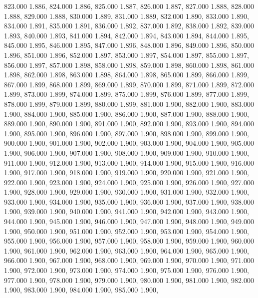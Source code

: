 823.000 1.886, 
824.000 1.886, 
825.000 1.887, 
826.000 1.887, 
827.000 1.888, 
828.000 1.888, 
829.000 1.888, 
830.000 1.889, 
831.000 1.889, 
832.000 1.890, 
833.000 1.890, 
834.000 1.891, 
835.000 1.891, 
836.000 1.892, 
837.000 1.892, 
838.000 1.892, 
839.000 1.893, 
840.000 1.893, 
841.000 1.894, 
842.000 1.894, 
843.000 1.894, 
844.000 1.895, 
845.000 1.895, 
846.000 1.895, 
847.000 1.896, 
848.000 1.896, 
849.000 1.896, 
850.000 1.896, 
851.000 1.896, 
852.000 1.897, 
853.000 1.897, 
854.000 1.897, 
855.000 1.897, 
856.000 1.897, 
857.000 1.898, 
858.000 1.898, 
859.000 1.898, 
860.000 1.898, 
861.000 1.898, 
862.000 1.898, 
863.000 1.898, 
864.000 1.898, 
865.000 1.899, 
866.000 1.899, 
867.000 1.899, 
868.000 1.899, 
869.000 1.899, 
870.000 1.899, 
871.000 1.899, 
872.000 1.899, 
873.000 1.899, 
874.000 1.899, 
875.000 1.899, 
876.000 1.899, 
877.000 1.899, 
878.000 1.899, 
879.000 1.899, 
880.000 1.899, 
881.000 1.900, 
882.000 1.900, 
883.000 1.900, 
884.000 1.900, 
885.000 1.900, 
886.000 1.900, 
887.000 1.900, 
888.000 1.900, 
889.000 1.900, 
890.000 1.900, 
891.000 1.900, 
892.000 1.900, 
893.000 1.900, 
894.000 1.900, 
895.000 1.900, 
896.000 1.900, 
897.000 1.900, 
898.000 1.900, 
899.000 1.900, 
900.000 1.900, 
901.000 1.900, 
902.000 1.900, 
903.000 1.900, 
904.000 1.900, 
905.000 1.900, 
906.000 1.900, 
907.000 1.900, 
908.000 1.900, 
909.000 1.900, 
910.000 1.900, 
911.000 1.900, 
912.000 1.900, 
913.000 1.900, 
914.000 1.900, 
915.000 1.900, 
916.000 1.900, 
917.000 1.900, 
918.000 1.900, 
919.000 1.900, 
920.000 1.900, 
921.000 1.900, 
922.000 1.900, 
923.000 1.900, 
924.000 1.900, 
925.000 1.900, 
926.000 1.900, 
927.000 1.900, 
928.000 1.900, 
929.000 1.900, 
930.000 1.900, 
931.000 1.900, 
932.000 1.900, 
933.000 1.900, 
934.000 1.900, 
935.000 1.900, 
936.000 1.900, 
937.000 1.900, 
938.000 1.900, 
939.000 1.900, 
940.000 1.900, 
941.000 1.900, 
942.000 1.900, 
943.000 1.900, 
944.000 1.900, 
945.000 1.900, 
946.000 1.900, 
947.000 1.900, 
948.000 1.900, 
949.000 1.900, 
950.000 1.900, 
951.000 1.900, 
952.000 1.900, 
953.000 1.900, 
954.000 1.900, 
955.000 1.900, 
956.000 1.900, 
957.000 1.900, 
958.000 1.900, 
959.000 1.900, 
960.000 1.900, 
961.000 1.900, 
962.000 1.900, 
963.000 1.900, 
964.000 1.900, 
965.000 1.900, 
966.000 1.900, 
967.000 1.900, 
968.000 1.900, 
969.000 1.900, 
970.000 1.900, 
971.000 1.900, 
972.000 1.900, 
973.000 1.900, 
974.000 1.900, 
975.000 1.900, 
976.000 1.900, 
977.000 1.900, 
978.000 1.900, 
979.000 1.900, 
980.000 1.900, 
981.000 1.900, 
982.000 1.900, 
983.000 1.900, 
984.000 1.900, 
985.000 1.900, 
